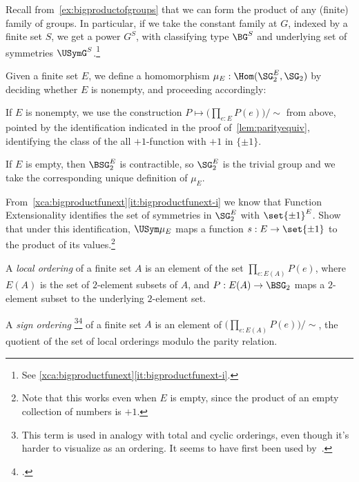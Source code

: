 Recall from~\cref{ex:bigproductofgroups} that we can form the
product of any (finite) family of groups.
In particular, if we take the constant family at $G$,
indexed by a finite set $S$, we get a power $G^S$,
with classifying type $\BG^S$ and underlying set of symmetries
$\USymG^S$.\footnote{See \cref{xca:bigproductfunext}\ref{it:bigproductfunext-i}.}

\begin{definition}\label{def:mu_E}
  Given a finite set $E$, we define a homomorphism 
  $\mu_E : \Hom(\SG_2^E,\SG_2)$ by deciding whether $E$
  is nonempty, and proceeding accordingly:

  If $E$ is nonempty, we use the construction
  $P \mapsto \bigl(\prod_{e:E}P(e)\bigr)/\sim$ from above,
  pointed by the identification indicated in the proof of~\cref{lem:parityequiv},
  \ie identifying the class of the all $+1$-function with $+1$ in $\{\pm1\}$.

  If $E$ is empty, then $\BSG_2^E$ is contractible, so $\SG_2^E$ is the trivial group
  and we take the corresponding unique definition of $\mu_E$.
\end{definition}

\begin{xca}
  From~\cref{xca:bigproductfunext}\ref{it:bigproductfunext-i}
  we know that Function Extensionality identifies the set of 
  symmetries in $\SG_2^E$ with $\set{\pm1}^E$.
  Show that under this identification, $\USym\mu_E$
  maps a function $s : E \to \set{\pm1}$
  to the product of its values.\footnote{%
    Note that this works even when $E$ is empty,
    since the product of an empty collection of numbers is $+1$.}
\end{xca}

\begin{definition}\label{def:sign-ordering}
  A \emph{local ordering} of a finite set $A$
  is an element of the set $\prod_{e:E(A)}P(e)$,
  where $E(A)$ is the set of $2$-element subsets of $A$,
  and $P : E(A) \to \BSG_2$ maps a $2$-element subset to the underlying $2$-element set.

  A \emph{sign ordering}%
  \footnote{This term is used in analogy with total and cyclic orderings,
    even though it's harder to visualize as an ordering.
    It seems to have first been used
    by~\citeauthor{Kuperberg1996}\footnotemark{}.}\footcitetext{Kuperberg1996}
  of a finite set $A$ is an element of
  $\bigl(\prod_{e:E(A)}P(e)\bigr)/\sim$,
  \ie the quotient of the set of local orderings
  modulo the parity relation.
\end{definition}


